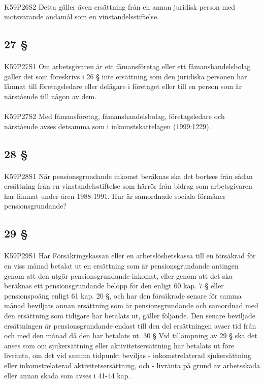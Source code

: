 \documentclass[a4paper,notitlepage,openany,10pt]{book}
\begin{document}
\paragraph*{}
{\tiny K59P26S2}
Detta gäller även ersättning från en annan juridisk person med motsvarande ändamål som en vinstandelsstiftelse.
\subsection*{27 §}
\paragraph*{}
{\tiny K59P27S1}
Om arbetsgivaren är ett fåmansföretag eller ett fåmanshandelsbolag gäller det som föreskrivs i 26 § inte ersättning som den juridiska personen har lämnat till företagsledare eller delägare i företaget eller till en person som är närstående till någon av dem.
\paragraph*{}
{\tiny K59P27S2}
Med fåmansföretag, fåmanshandelsbolag, företagsledare och närstående avses detsamma som i inkomstskattelagen (1999:1229).
\subsection*{28 §}
\paragraph*{}
{\tiny K59P28S1}
När pensionsgrundande inkomst beräknas ska det bortses från sådan ersättning från en vinstandelsstiftelse som härrör från bidrag som arbetsgivaren har lämnat under åren 1988-1991.
Hur är samordnade sociala förmåner pensionsgrundande?
\subsection*{29 §}
\paragraph*{}
{\tiny K59P29S1}
Har Försäkringskassan eller en arbetslöshetskassa till en försäkrad för en viss månad betalat ut en ersättning som är pensionsgrundande antingen genom att den utgör pensionsgrundande inkomst, eller genom att det ska beräknas ett pensionsgrundande belopp för den enligt 60 kap. 7 § eller pensionspoäng enligt 61 kap. 20 §, och har den försäkrade senare för samma månad beviljats annan ersättning som är pensionsgrundande och samordnad med den ersättning som tidigare har betalats ut, gäller följande. Den senare beviljade ersättningen är pensionsgrundande endast till den del ersättningen avser tid från och med den månad då den har betalats ut. 30 § Vid tillämpning av 29 § ska det anses som om sjukersättning eller aktivitetsersättning har betalats ut före livränta, om det vid samma tidpunkt beviljas
\newline - inkomstrelaterad sjukersättning eller inkomstrelaterad aktivitetsersättning, och - livränta på grund av arbetsskada eller annan skada som avses i 41-44 kap.
\end{document}
